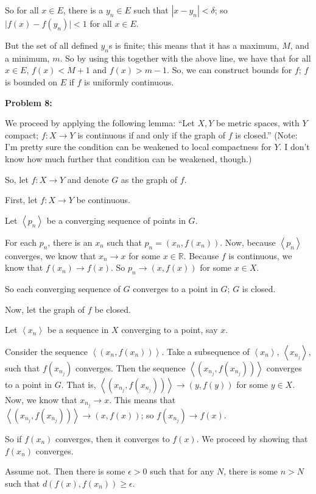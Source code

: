 \documentclass[a4paper,12pt]{article}
\newcommand{\tab}{\hspace{4mm}} %
\newcommand{\shunt}{\vspace{20mm}}
\newcommand{\absval}[1]{\lvert #1 \rvert}
\newcommand{\anbrack}[1]{\left\langle #1 \right\rangle}
\newcommand{\de}{\delta}
\newcommand{\ep}{\epsilon}
\newcommand{\R}{\mathbb{R}}
\begin{document}
So for all $x \in E$, there is a $y_n \in E$ such that $|x-y_n| < \de$; so $\absval{f(x)-f(y_n)} < 1$ for all $x \in E$.

But the set of all defined $y_n$s is finite; this means that it has a maximum, $M$, and a minimum, $m$. So by using this together with the above line, we have that for all $x \in E$, $f(x) < M+1$ and $f(x) > m-1$. So, we can construct bounds for $f$; $f$ is bounded on $E$ if $f$ is uniformly continuous.
\shunt

{\bf Problem 8:}

We proceed by applying the following lemma: ``Let $X, Y$ be metric spaces, with $Y$ compact; $f: X \to Y$ is continuous if and only if the graph of $f$ is closed.'' (Note: I'm pretty sure the condition can be weakened to local compactness for $Y$. I don't know how much further that condition can be weakened, though.)

So, let $f: X \to Y$ and denote $G$ as the graph of $f$.

First, let $f: X \to Y$ be continuous.

\tab Let $\anbrack{p_n}$ be a converging sequence of points in $G$.

\tab For each $p_n$, there is an $x_n$ such that $p_n = (x_n, f(x_n))$. Now, because $\anbrack{p_n}$ converges, we know that $x_n \to x$ for some $x \in \R$. Because $f$ is continuous, we know that $f(x_n) \to f(x)$. So $p_n \to (x,f(x))$ for some $x \in X$.

\tab So each converging sequence of $G$ converges to a point in $G$; $G$ is closed.

Now, let the graph of $f$ be closed.

\tab Let $\anbrack{x_n}$ be a sequence in $X$ converging to a point, say $x$.

\tab Consider the sequence $\anbrack{(x_n,f(x_n))}$. Take a subsequence of $\anbrack{x_n}$, $\anbrack{x_{n_j}}$, such that $f(x_{n_j})$ converges. Then the sequence $\anbrack{(x_{n_j},f(x_{n_j}))}$ converges to a point in $G$. That is, $\anbrack{(x_{n_j},f(x_{n_j}))} \to (y, f(y))$ for some $y \in X$. Now, we know that $x_{n_j} \to x$. This means that $\anbrack{(x_{n_j},f(x_{n_j}))} \to (x, f(x))$; so $f(x_{n_j}) \to f(x)$.

\tab So if $f(x_n)$ converges, then it converges to $f(x)$. We proceed by showing that $f(x_n)$ converges.

\tab \tab Assume not. Then there is some $\ep >0$ such that for any $N$, there is some $n >N$ such that $d(f(x),f(x_n)) \geq \ep$.
\end{document}
